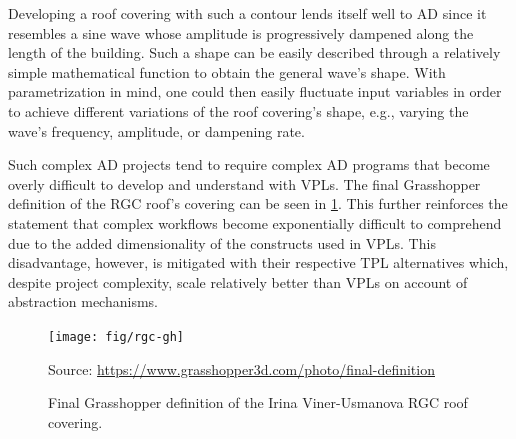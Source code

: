 Developing a roof covering with such a contour lends itself well to \ac{AD}
since it resembles a sine wave whose amplitude is progressively dampened along
the length of the building.  Such a shape can be easily described through a
relatively simple mathematical function to obtain the general wave's shape.
With parametrization in mind, one could then easily fluctuate input variables in
order to achieve different variations of the roof covering's shape, e.g.,
varying the wave's frequency, amplitude, or dampening rate.

Such complex \ac{AD} projects tend to require complex \ac{AD} programs that
become overly difficult to develop and understand with \acp{VPL}.  The final
Grasshopper definition of the \ac{RGC} roof's covering can be seen in
\cref{fig:related.ad.vpl-scalability.rgc-gh}.  This further reinforces the
statement that complex workflows become exponentially difficult to comprehend
due to the added dimensionality of the constructs used in \acp{VPL}.  This
disadvantage, however, is mitigated with their respective \ac{TPL} alternatives
which, despite project complexity, scale relatively better than \acp{VPL} on
account of abstraction mechanisms.

\begin{landscape}
\begin{figure}
  \texttt{[image: fig/rgc-gh]}
  \begin{minipage}{\linewidth}
  \scriptsize Source: \url{https://www.grasshopper3d.com/photo/final-definition}
  \end{minipage}
  \caption[Grasshopper definition of the \acl{RGC} roof covering]{
    Final Grasshopper definition of the Irina Viner-Usmanova \ac{RGC} roof
    covering.}%
  \label{fig:related.ad.vpl-scalability.rgc-gh}
\end{figure}
\end{landscape}
